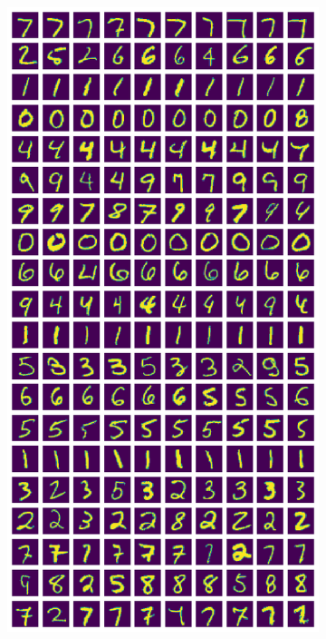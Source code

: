\documentclass[10pt,a4paper, nocenter]{report}
\begin{document}
\begin{enumerate}
        \begin{figure}[h]
            \begin{center}
                \begin{subfigure}[b]{0.4\textwidth}
                    \centering
                    \includegraphics[width=\textwidth]{../../images/number_clustering.png}

\end{subfigure}
\end{center}
\end{figure}
\end{enumerate}
\end{document}
